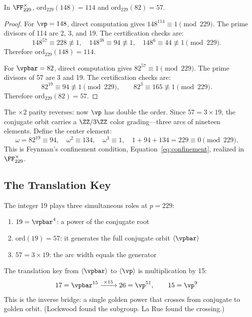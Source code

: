 \begin{theorem}[La Rue order theorem at $p = 229$]\label{thm:larue_order}
In $\FF_{229}^\times$, $\mathrm{ord}_{229}(148) = 114$ and $\mathrm{ord}_{229}(82) = 57$.
\end{theorem}

\begin{proof}
For $\vp = 148$, direct computation gives $148^{114} \equiv 1 \pmod{229}$. The prime divisors of 114 are 2, 3, and 19. The certification checks are:
\[
148^{57} \equiv 228 \not\equiv 1, \quad 148^{38} \equiv 94 \not\equiv 1, \quad 148^{6} \equiv 44 \not\equiv 1 \pmod{229}.
\]
Therefore $\mathrm{ord}_{229}(148) = 114$.

For $\vpbar = 82$, direct computation gives $82^{57} \equiv 1 \pmod{229}$. The prime divisors of 57 are 3 and 19. The certification checks are:
\[
82^{19} \equiv 94 \not\equiv 1 \pmod{229}, \qquad 82^{3} \equiv 165 \not\equiv 1 \pmod{229}.
\]
Therefore $\mathrm{ord}_{229}(82) = 57$. \qedhere
\end{proof}

The $\times 2$ parity reverses: now $\vp$ has double the order. Since $57 = 3 \times 19$, the conjugate orbit carries a $\ZZ/3\ZZ$ color grading---three arcs of nineteen elements. Define the center element:
\[
\omega = 82^{19} \equiv 94, \quad \omega^2 \equiv 134, \quad \omega^3 \equiv 1, \quad 1 + 94 + 134 = 229 \equiv 0 \pmod{229}.
\]
This is Feynman's confinement condition, Equation~\eqref{eq:confinement}, realized in $\FF_{229}^\times$.

\subsection{The Translation Key}

The integer 19 plays three simultaneous roles at $p = 229$:
\begin{enumerate}[label=(\alph*)]
\item $19 = \vpbar^4$: a power of the conjugate root
\item $\mathrm{ord}(19) = 57$: it generates the full conjugate orbit $\langle \vpbar \rangle$
\item $57 = 3 \times 19$: the arc width equals the generator
\end{enumerate}

The translation key from $\langle \vpbar \rangle$ to $\langle \vp \rangle$ is multiplication by 15:
\begin{equation}\label{eq:key}
17 = \vpbar^{15} \xrightarrow{\;\times 15\;} 26 = \vp^{51}, \qquad 15 = \vp^9
\end{equation}
This is the inverse bridge: a single golden power that crosses from conjugate to golden orbit. (Lockwood found the subgroup. La Rue found the crossing.)


